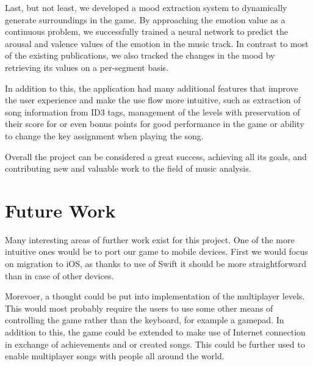 Last, but not least, we developed a mood extraction system to dynamically generate surroundings in the game. By approaching the emotion value as a continuous problem, we successfully trained a neural network to predict the arousal and valence values of the emotion in the music track. In contrast to most of the existing publications, we also tracked the changes in the mood by retrieving its values on a per-segment basis.

In addition to this, the application had many additional features that improve the user experience and make the use flow more intuitive, such as extraction of song information from ID3 tags, management of the levels with preservation of their score for or even bonus points for good performance in the game or ability to change the key assignment when playing the song.

Overall the project can be considered a great success, achieving all its goals, and contributing new and valuable work to the field of music analysis.

\section{Future Work}

Many interesting areas of further work exist for this project. One of the more intuitive ones would be to port our game to mobile devices. First we would focus on migration to iOS, as thanks to use of Swift it should be more straightforward than in case of other devices. 

Morevoer, a thought could be put into implementation of the multiplayer levels. This would most probably require the users to use some other means of controlling the game rather than the keyboard, for example a gamepad. In addition to this, the game could be extended to make use of Internet connection in exchange of achievements and or created songs. This could be further used to enable multiplayer songs with people all around the world. 